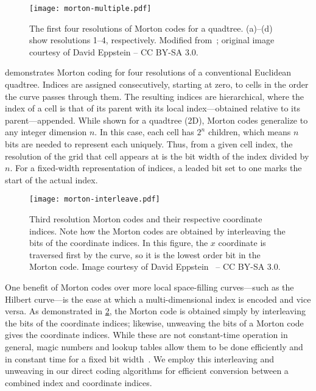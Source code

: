 \begin{figure}[htb!]
	\centering
	\texttt{[image: morton-multiple.pdf]}
	\caption[Four resolutions of Morton codes]{
		The first four resolutions of Morton codes for a quadtree.
		(a)--(d) show resolutions 1--4, respectively.
		Modified from~\cite{morton-multiple}; original image courtesy of David Eppstein -- CC BY-SA 3.0.
	}
	\label{fig:morton-multiple}
\end{figure}


 demonstrates Morton coding for four resolutions of a conventional Euclidean quadtree.
Indices are assigned consecutively, starting at zero, to cells in the order the curve passes through them.
The resulting indices are hierarchical, where the index of a cell is that of its parent with its local index---obtained relative to its parent---appended.
While shown for a quadtree (2D), Morton codes generalize to any integer dimension $n$.
In this case, each cell has $2^n$ children, which means $n$ bits are needed to represent each uniquely.
Thus, from a given cell index, the resolution of the grid that cell appears at is the bit width of the index divided by $n$.
For a fixed-width representation of indices, a leaded bit set to one marks the start of the actual index.


\begin{figure}[htp!]
	\centering
	\texttt{[image: morton-interleave.pdf]}
	\caption[Morton codes by bit-interleaving]{
		Third resolution Morton codes and their respective coordinate indices.
		Note how the Morton codes are obtained by interleaving the bits of the coordinate indices.
		In this figure, the $x$ coordinate is traversed first by the curve, so it is the lowest order bit in the Morton code.
		Image courtesy of David Eppstein~\cite{morton-interleave} -- CC BY-SA 3.0.
	}
	\label{fig:morton-interleave}
\end{figure}


One benefit of Morton codes over more local space-filling curves---such as the Hilbert curve---is the ease at which a multi-dimensional index is encoded and vice versa.
As demonstrated in \cref{fig:morton-interleave}, the Morton code is obtained simply by interleaving the bits of the coordinate indices; likewise, unweaving the bits of a Morton code gives the coordinate indices.
While these are not constant-time operation in general, magic numbers and lookup tables allow them to be done efficiently and in constant time for a fixed bit width~\cite{libmorton18}.
We employ this interleaving and unweaving in our direct coding algorithms for efficient conversion between a combined index and coordinate indices.


